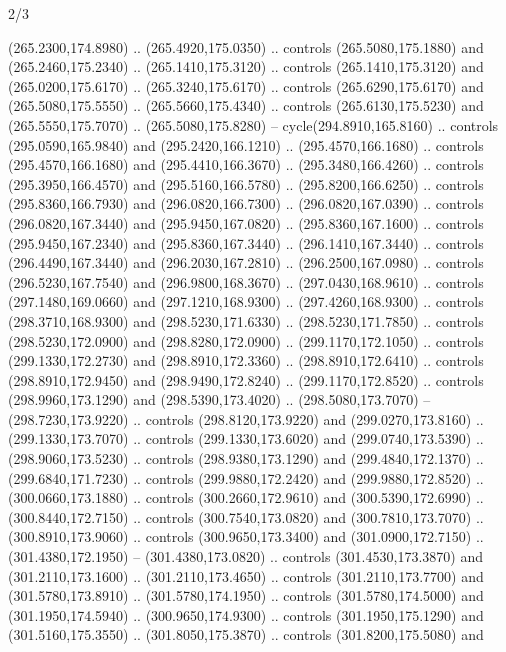 \begin{flagdescription}{2/3}
\begin{scope}[xshift=0.5\flaglength,yshift=0.5\flagwidth,scale=\flagwidth/259.2]
\begin{scope}[y=0.8pt, x=0.8pt, yscale=-1,shift={(-243,-162)}]
      (265.2300,174.8980) .. (265.4920,175.0350) .. controls (265.5080,175.1880) and
      (265.2460,175.2340) .. (265.1410,175.3120) .. controls (265.1410,175.3120) and
      (265.0200,175.6170) .. (265.3240,175.6170) .. controls (265.6290,175.6170) and
      (265.5080,175.5550) .. (265.5660,175.4340) .. controls (265.6130,175.5230) and
      (265.5550,175.7070) .. (265.5080,175.8280) -- cycle(294.8910,165.8160) ..
      controls (295.0590,165.9840) and (295.2420,166.1210) .. (295.4570,166.1680) ..
      controls (295.4570,166.1680) and (295.4410,166.3670) .. (295.3480,166.4260) ..
      controls (295.3950,166.4570) and (295.5160,166.5780) .. (295.8200,166.6250) ..
      controls (295.8360,166.7930) and (296.0820,166.7300) .. (296.0820,167.0390) ..
      controls (296.0820,167.3440) and (295.9450,167.0820) .. (295.8360,167.1600) ..
      controls (295.9450,167.2340) and (295.8360,167.3440) .. (296.1410,167.3440) ..
      controls (296.4490,167.3440) and (296.2030,167.2810) .. (296.2500,167.0980) ..
      controls (296.5230,167.7540) and (296.9800,168.3670) .. (297.0430,168.9610) ..
      controls (297.1480,169.0660) and (297.1210,168.9300) .. (297.4260,168.9300) ..
      controls (298.3710,168.9300) and (298.5230,171.6330) .. (298.5230,171.7850) ..
      controls (298.5230,172.0900) and (298.8280,172.0900) .. (299.1170,172.1050) ..
      controls (299.1330,172.2730) and (298.8910,172.3360) .. (298.8910,172.6410) ..
      controls (298.8910,172.9450) and (298.9490,172.8240) .. (299.1170,172.8520) ..
      controls (298.9960,173.1290) and (298.5390,173.4020) .. (298.5080,173.7070) --
      (298.7230,173.9220) .. controls (298.8120,173.9220) and (299.0270,173.8160) ..
      (299.1330,173.7070) .. controls (299.1330,173.6020) and (299.0740,173.5390) ..
      (298.9060,173.5230) .. controls (298.9380,173.1290) and (299.4840,172.1370) ..
      (299.6840,171.7230) .. controls (299.9880,172.2420) and (299.9880,172.8520) ..
      (300.0660,173.1880) .. controls (300.2660,172.9610) and (300.5390,172.6990) ..
      (300.8440,172.7150) .. controls (300.7540,173.0820) and (300.7810,173.7070) ..
      (300.8910,173.9060) .. controls (300.9650,173.3400) and (301.0900,172.7150) ..
      (301.4380,172.1950) -- (301.4380,173.0820) .. controls (301.4530,173.3870) and
      (301.2110,173.1600) .. (301.2110,173.4650) .. controls (301.2110,173.7700) and
      (301.5780,173.8910) .. (301.5780,174.1950) .. controls (301.5780,174.5000) and
      (301.1950,174.5940) .. (300.9650,174.9300) .. controls (301.1950,175.1290) and
      (301.5160,175.3550) .. (301.8050,175.3870) .. controls (301.8200,175.5080) and

\end{scope}
\end{scope}
\end{flagdescription}
